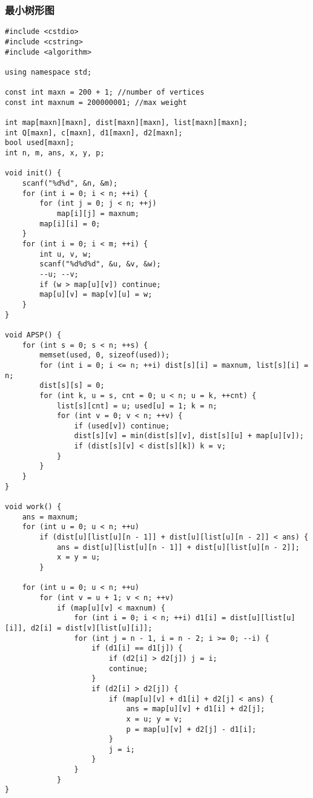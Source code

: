 \subsubsection{最小树形图}
\begin{verbatim}
#include <cstdio>
#include <cstring>
#include <algorithm>

using namespace std;

const int maxn = 200 + 1; //number of vertices
const int maxnum = 200000001; //max weight

int map[maxn][maxn], dist[maxn][maxn], list[maxn][maxn];
int Q[maxn], c[maxn], d1[maxn], d2[maxn];
bool used[maxn];
int n, m, ans, x, y, p;

void init() {
    scanf("%d%d", &n, &m);
    for (int i = 0; i < n; ++i) {
        for (int j = 0; j < n; ++j)
            map[i][j] = maxnum;
        map[i][i] = 0;
    }
    for (int i = 0; i < m; ++i) {
        int u, v, w;
        scanf("%d%d%d", &u, &v, &w);
        --u; --v;
        if (w > map[u][v]) continue;
        map[u][v] = map[v][u] = w;
    }
}

void APSP() {
    for (int s = 0; s < n; ++s) {
        memset(used, 0, sizeof(used));
        for (int i = 0; i <= n; ++i) dist[s][i] = maxnum, list[s][i] = n;
        dist[s][s] = 0;
        for (int k, u = s, cnt = 0; u < n; u = k, ++cnt) {
            list[s][cnt] = u; used[u] = 1; k = n;
            for (int v = 0; v < n; ++v) {
                if (used[v]) continue;
                dist[s][v] = min(dist[s][v], dist[s][u] + map[u][v]);
                if (dist[s][v] < dist[s][k]) k = v;
            }
        }
    }
}

void work() {
    ans = maxnum;
    for (int u = 0; u < n; ++u)
        if (dist[u][list[u][n - 1]] + dist[u][list[u][n - 2]] < ans) {
            ans = dist[u][list[u][n - 1]] + dist[u][list[u][n - 2]];
            x = y = u;
        }

    for (int u = 0; u < n; ++u)
        for (int v = u + 1; v < n; ++v)
            if (map[u][v] < maxnum) {
                for (int i = 0; i < n; ++i) d1[i] = dist[u][list[u][i]], d2[i] = dist[v][list[u][i]];
                for (int j = n - 1, i = n - 2; i >= 0; --i) {
                    if (d1[i] == d1[j]) {
                        if (d2[i] > d2[j]) j = i;
                        continue;
                    }
                    if (d2[i] > d2[j]) {
                        if (map[u][v] + d1[i] + d2[j] < ans) {
                            ans = map[u][v] + d1[i] + d2[j];
                            x = u; y = v;
                            p = map[u][v] + d2[j] - d1[i];
                        }
                        j = i;
                    }
                }
            }
}


\end{verbatim}
